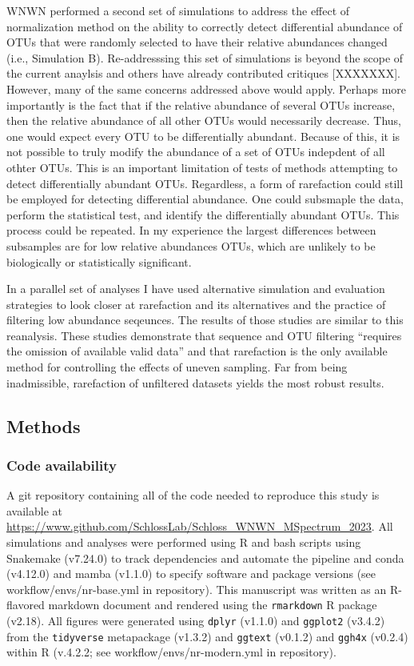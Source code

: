 \documentclass[
]{article}
\begin{document}
WNWN performed a second set of simulations to address the effect of
normalization method on the ability to correctly detect differential
abundance of OTUs that were randomly selected to have their relative
abundances changed (i.e., Simulation B). Re-addresssing this set of
simulations is beyond the scope of the current anaylsis and others have
already contributed critiques {[}XXXXXXX{]}. However, many of the same
concerns addressed above would apply. Perhaps more importantly is the
fact that if the relative abundance of several OTUs increase, then the
relative abundance of all other OTUs would necessarily decrease. Thus,
one would expect every OTU to be differentially abundant. Because of
this, it is not possible to truly modify the abundance of a set of OTUs
indepdent of all othter OTUs. This is an important limitation of tests
of methods attempting to detect differentially abundant OTUs.
Regardless, a form of rarefaction could still be employed for detecting
differential abundance. One could subsmaple the data, perform the
statistical test, and identify the differentially abundant OTUs. This
process could be repeated. In my experience the largest differences
between subsamples are for low relative abundances OTUs, which are
unlikely to be biologically or statistically significant.

In a parallel set of analyses I have used alternative simulation and
evaluation strategies to look closer at rarefaction and its alternatives
and the practice of filtering low abundance seqeunces. The results of
those studies are similar to this reanalysis. These studies demonstrate
that sequence and OTU filtering ``requires the omission of available
valid data'' and that rarefaction is the only available method for
controlling the effects of uneven sampling. Far from being inadmissible,
rarefaction of unfiltered datasets yields the most robust results.

\hypertarget{methods}{%
\subsection{Methods}\label{methods}}

\hypertarget{code-availability}{%
\subsubsection{Code availability}\label{code-availability}}

A git repository containing all of the code needed to reproduce this
study is available at
\url{https://www.github.com/SchlossLab/Schloss_WNWN_MSpectrum_2023}. All
simulations and analyses were performed using R and bash scripts using
Snakemake (v7.24.0) to track dependencies and automate the pipeline and
conda (v4.12.0) and mamba (v1.1.0) to specify software and package
versions (see workflow/envs/nr-base.yml in repository). This manuscript
was written as an R-flavored markdown document and rendered using the
\texttt{rmarkdown} R package (v2.18). All figures were generated using
\texttt{dplyr} (v1.1.0) and \texttt{ggplot2} (v3.4.2) from the
\texttt{tidyverse} metapackage (v1.3.2) and \texttt{ggtext} (v0.1.2) and
\texttt{ggh4x} (v0.2.4) within R (v.4.2.2; see
workflow/envs/nr-modern.yml in repository).
\end{document}
